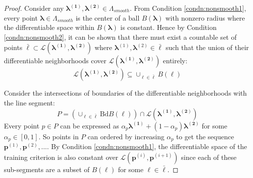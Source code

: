 \documentclass[12pt]{article}
\begin{document}
\begin{proof}
	Consider any $\boldsymbol{\lambda^{(1)}},\boldsymbol{\lambda^{(2)}}\in\Lambda_{smooth}$. 
	From Condition \ref{condn:nonsmooth1}, every point $\boldsymbol{\lambda} \in \Lambda_{smooth}$ is the center of a ball $B(\boldsymbol{\lambda})$ with nonzero radius where the differentiable space within $B(\boldsymbol{\lambda})$ is constant.
	Hence by Condition \ref{condn:nonsmooth2}, it can be shown that there must exist a countable
	set of points $\bar{\boldsymbol{\ell}} 
	\subset\mathcal{L}(\boldsymbol{\lambda^{(1)}},\boldsymbol{\lambda^{(2)}})$ where $\boldsymbol{\lambda}^{(1)}, \boldsymbol{\lambda}^{(2)} \in \bar{\boldsymbol{\ell}}$
	such that the union of their differentiable neighborhoods cover  $\mathcal{L}(\boldsymbol{\lambda^{(1)}},\boldsymbol{\lambda^{(2)}})$ entirely:
	\[
	\mathcal{L}\left(\boldsymbol{\lambda^{(1)}},\boldsymbol{\lambda^{(2)}}\right) \subseteq \cup_{\ell \in \bar{\boldsymbol{\ell}}}B(\boldsymbol{\ell})
	\]
	
	Consider the intersections of boundaries of the differentiable neighborhoods with the line segment:
	\[
	P=
	\left ( 
	\cup_{\ell \in \bar{\boldsymbol{\ell}}}
	\mbox{Bd}B\left(\boldsymbol{\ell}\right)
	\right )
	\cap\mathcal{L}(\boldsymbol{\lambda^{(1)}},\boldsymbol{\lambda^{(2)}})
	\]
	Every point $p\in P$ can be expressed as $\alpha_{p}\boldsymbol{\lambda^{(1)}}+(1-\alpha_{p})\boldsymbol{\lambda^{(2)}}$
	for some $\alpha_{p}\in[0,1]$. So points in $P$ can ordered by increasing $\alpha_{p}$ to get the sequence $\boldsymbol{p}^{(1)}, \boldsymbol{p}^{(2)}, ... $.
	By Condition \ref{condn:nonsmooth1}, the differentiable space of the training criterion
	is also constant over $\mathcal{L}\left(\boldsymbol{p}^{(i)},\boldsymbol{p}^{(i+1)}\right)$ since each of these sub-segments are a subset of $B(\boldsymbol{\ell})$ for some $\boldsymbol{\ell} \in \bar{\boldsymbol{\ell}}$. 
	

\end{proof}
\end{document}
